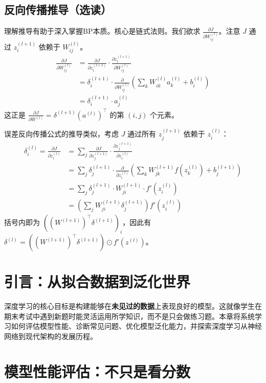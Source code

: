 \subsection{反向传播推导（选读）}
理解推导有助于深入掌握BP本质。核心是链式法则。我们欲求 $\frac{\partial J}{\partial W_{ij}^{(l)}}$。注意 $J$ 通过 $z_i^{(l+1)}$ 依赖于 $W_{ij}^{(l)}$。
\begin{align*}
\frac{\partial J}{\partial W_{ij}^{(l)}} &= \frac{\partial J}{\partial z_i^{(l+1)}} \cdot \frac{\partial z_i^{(l+1)}}{\partial W_{ij}^{(l)}} \\
&= \delta_i^{(l+1)} \cdot \frac{\partial}{\partial W_{ij}^{(l)}} \left( \sum_k W_{ik}^{(l)} a_k^{(l)} + b_i^{(l)} \right) \\
&= \delta_i^{(l+1)} \cdot a_j^{(l)}
\end{align*}
这正是 $\frac{\partial J}{\partial W^{(l)}} = \delta^{(l+1)} (a^{(l)})^{\top}$ 的第 $(i, j)$ 个元素。

误差反向传播公式的推导类似，考虑 $J$ 通过所有 $z_j^{(l+1)}$ 依赖于 $z_i^{(l)}$：
\begin{align*}
\delta_i^{(l)} = \frac{\partial J}{\partial z_i^{(l)}} &= \sum_j \frac{\partial J}{\partial z_j^{(l+1)}} \cdot \frac{\partial z_j^{(l+1)}}{\partial z_i^{(l)}} \\
&= \sum_j \delta_j^{(l+1)} \cdot \frac{\partial}{\partial z_i^{(l)}} \left( \sum_k W_{jk}^{(l+1)} f(z_k^{(l)}) + b_j^{(l+1)} \right) \\
&= \sum_j \delta_j^{(l+1)} \cdot W_{ji}^{(l+1)} \cdot f'(z_i^{(l)}) \\
&= \left( \sum_j W_{ji}^{(l+1)} \delta_j^{(l+1)} \right) f'(z_i^{(l)})
\end{align*}
括号内即为 $( (W^{(l+1)})^{\top} \delta^{(l+1)} )_i$，因此有 $\delta^{(l)} = ((W^{(l+1)})^{\top} \delta^{(l+1)}) \odot f'(z^{(l)})$。

\section{引言：从拟合数据到泛化世界}

深度学习的核心目标是构建能够在\textbf{未见过的数据}上表现良好的模型。这就像学生在期末考试中遇到新题时能灵活运用所学知识，而不是只会做练习题。本章将系统学习如何评估模型性能、诊断常见问题、优化模型泛化能力，并探索深度学习从神经网络到现代架构的发展历程。

\section{模型性能评估：不只是看分数}

